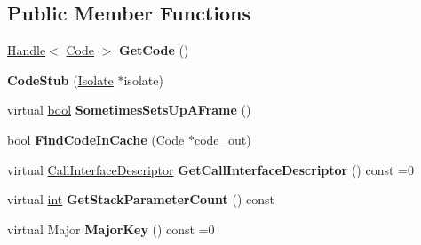 \subsection*{Public Member Functions}
\begin{DoxyCompactItemize}
\item 
\mbox{\label{classv8_1_1internal_1_1CodeStub_a7dd0ee9f6ed0bb3269498f791b9b103c}} 
\mbox{\hyperlink{classv8_1_1internal_1_1Handle}{Handle}}$<$ \mbox{\hyperlink{classv8_1_1internal_1_1Code}{Code}} $>$ {\bfseries Get\+Code} ()
\item 
\mbox{\label{classv8_1_1internal_1_1CodeStub_a91373401aac008290d1a07477f5750ac}} 
{\bfseries Code\+Stub} (\mbox{\hyperlink{classv8_1_1internal_1_1Isolate}{Isolate}} $\ast$isolate)
\item 
\mbox{\label{classv8_1_1internal_1_1CodeStub_a983df1dde643508536e1b1ba62fa0fa8}} 
virtual \mbox{\hyperlink{classbool}{bool}} {\bfseries Sometimes\+Sets\+Up\+A\+Frame} ()
\item 
\mbox{\label{classv8_1_1internal_1_1CodeStub_ab081df3daa52dd794e67708ea4b3cf3c}} 
\mbox{\hyperlink{classbool}{bool}} {\bfseries Find\+Code\+In\+Cache} (\mbox{\hyperlink{classv8_1_1internal_1_1Code}{Code}} $\ast$code\+\_\+out)
\item 
\mbox{\label{classv8_1_1internal_1_1CodeStub_a2047fe312dfc5da7aaa4970a9cfcc9ea}} 
virtual \mbox{\hyperlink{classv8_1_1internal_1_1CallInterfaceDescriptor}{Call\+Interface\+Descriptor}} {\bfseries Get\+Call\+Interface\+Descriptor} () const =0
\item 
\mbox{\label{classv8_1_1internal_1_1CodeStub_a48a36e9a9aff455a5c69dea11bc0790d}} 
virtual \mbox{\hyperlink{classint}{int}} {\bfseries Get\+Stack\+Parameter\+Count} () const
\item 
\mbox{\label{classv8_1_1internal_1_1CodeStub_ab54439b9fba9baedce3fc4eda5599f88}} 
virtual Major {\bfseries Major\+Key} () const =0
\item 
\mbox{\label{classv8_1_1internal_1_1CodeStub_ac2d639a6528fb9715f9a0209c63ffcf4}} 

\end{DoxyCompactItemize}
